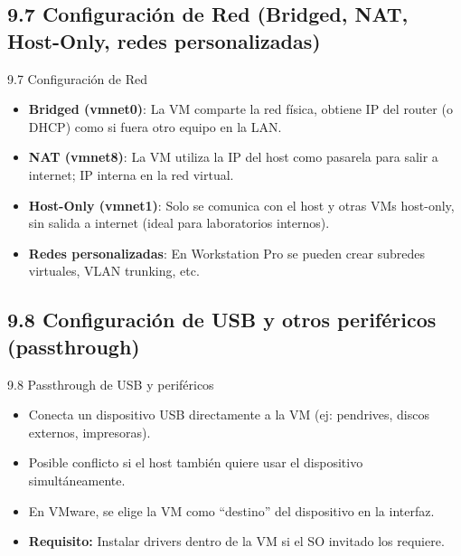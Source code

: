 \documentclass{beamer}
\begin{document}
\subsection{9.7 Configuración de Red (Bridged, NAT, Host-Only, redes personalizadas)}
\begin{frame}{9.7 Configuración de Red}
    \begin{itemize}
        \item \textbf{Bridged (vmnet0)}: La VM comparte la red física, obtiene IP del router (o DHCP) como si fuera otro equipo en la LAN.
        \item \textbf{NAT (vmnet8)}: La VM utiliza la IP del host como pasarela para salir a internet; IP interna en la red virtual.
        \item \textbf{Host-Only (vmnet1)}: Solo se comunica con el host y otras VMs host-only, sin salida a internet (ideal para laboratorios internos).
        \item \textbf{Redes personalizadas}: En Workstation Pro se pueden crear subredes virtuales, VLAN trunking, etc.
    \end{itemize}
\end{frame}

\subsection{9.8 Configuración de USB y otros periféricos (passthrough)}
\begin{frame}{9.8 Passthrough de USB y periféricos}
    \begin{itemize}
        \item Conecta un dispositivo USB directamente a la VM (ej: pendrives, discos externos, impresoras).
        \item Posible conflicto si el host también quiere usar el dispositivo simultáneamente.
        \item En VMware, se elige la VM como “destino” del dispositivo en la interfaz.
        \item \textbf{Requisito:} Instalar drivers dentro de la VM si el SO invitado los requiere.
    \end{itemize}
\end{frame}

\end{document}
